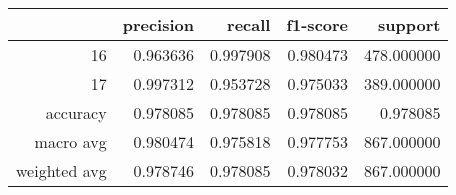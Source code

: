 \begin{tabular}{rrrrr}
\toprule
 & precision & recall & f1-score & support \\
\midrule
16 & 0.963636 & 0.997908 & 0.980473 & 478.000000 \\
17 & 0.997312 & 0.953728 & 0.975033 & 389.000000 \\
accuracy & 0.978085 & 0.978085 & 0.978085 & 0.978085 \\
macro avg & 0.980474 & 0.975818 & 0.977753 & 867.000000 \\
weighted avg & 0.978746 & 0.978085 & 0.978032 & 867.000000 \\
\bottomrule
\end{tabular}
